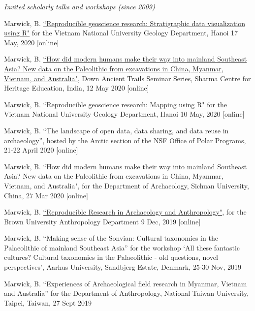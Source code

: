 

\medskip

\noindent\emph{Invited scholarly talks and workshops (since 2009)\vspace{0.01in}}

\medskip

\ind Marwick, B. \href{https://github.com/benmarwick/VNU-Geoscience-mapping-with-R-Workshop}{``Reproducible geoscience research: Stratigraphic data visualization using R"} for the Vietnam National University Geology Department, Hanoi 17 May, 2020 [online]

\ind Marwick, B. \href{http://www.sharmaheritage.com/down-ancient-trails-archaeology-forum-}{``How did modern humans make their way into mainland Southeast Asia? New data on the Paleolithic from excavations in China, Myanmar, Vietnam, and Australia"}, Down Ancient Trails Seminar Series, Sharma Centre for Heritage Education, India, 12 May 2020   [online]

\ind Marwick, B. \href{https://github.com/benmarwick/VNU-Geoscience-mapping-with-R-Workshop}{``Reproducible geoscience research: Mapping using R"} for the Vietnam National University Geology Department, Hanoi 10 May, 2020  [online]

\ind Marwick, B. ``The landscape of open data, data sharing, and data reuse in archaeology”, hosted by the Arctic section of the NSF Office of Polar Programs, 21-22 April 2020 [online]

\ind Marwick, B. ``How did modern humans make their way into mainland Southeast Asia? New data on the Paleolithic from excavations in China, Myanmar, Vietnam, and Australia", for the Department of Archaeology, Sichuan University, China, 27 Mar 2020 [online]

\ind Marwick, B. \href{https://benmarwick.github.io/2019-12-09-brown/}{``Reproducible Research in Archaeology and Anthropology"}, for the Brown University Anthropology Department 9 Dec, 2019 [online]

\ind Marwick, B. ``Making sense of the Sonvian: Cultural taxonomies in the Palaeolithic of mainland Southeast Asia” for the workshop ‘All these fantastic cultures? Cultural taxonomies in the Palaeolithic - old questions, novel perspectives’, Aarhus University, Sandbjerg Estate, Denmark, 25-30 Nov, 2019 

\ind Marwick, B. ``Experiences of Archaeological field research in Myanmar, Vietnam and Australia” for the Department of Anthropology, National Taiwan University, Taipei, Taiwan, 27 Sept 2019

